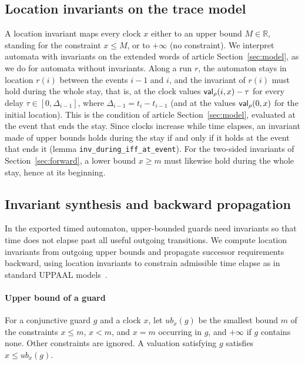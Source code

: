\subsection{Location invariants on the trace model}
\label{sec:inv-semantics}
A location invariant maps every clock $x$ either to an upper bound
$M\in\mathbb R$, standing for the constraint $x\le M$, or to $+\infty$ (no
constraint).  We interpret automata with invariants on the extended words of
article Section~\ref{sec:model}, as we do for automata without invariants.
Along a run $r$, the automaton stays in location $r(i)$ between the events
$i-1$ and $i$, and the invariant of $r(i)$ must hold during the whole stay,
that is, at the clock values $\mathsf{val}_\rho(i,x)-\tau$ for every delay
$\tau\in[0,\Delta_{i-1}]$, where $\Delta_{i-1}=t_i-t_{i-1}$ (and at the values $\mathsf{val}_\rho(0,x)$ for the
initial location).  This is the condition of article Section~\ref{sec:model}, evaluated at
the event that ends the stay.  Since clocks increase while time elapses, an
invariant made of upper bounds holds during the stay if and only if it holds at
the event that ends it (lemma \texttt{inv\_\allowbreak{}during\_\allowbreak{}iff\_\allowbreak{}at\_\allowbreak{}event}).
For the two-sided invariants of Section~\ref{sec:forward}, a lower bound
$x\ge m$ must likewise hold during the whole stay, hence at its beginning.

\subsection{Invariant synthesis and backward propagation}
\label{sec:uppaal-invariants}\label{sec:main-invariants}
In the exported timed automaton, upper-bounded guards need invariants so that
time does not elapse past all useful outgoing transitions.  We compute location
invariants from outgoing upper bounds and propagate successor requirements
backward, using location invariants to constrain admissible time elapse as in
standard UPPAAL models~\cite{[BGD04]}.

\paragraph{Upper bound of a guard}
For a conjunctive guard $g$ and a clock $x$, let $\mathit{ub}_x(g)$ be the
smallest bound $m$ of the constraints $x\le m$, $x<m$, and $x=m$ occurring in
$g$, and $+\infty$ if $g$ contains none.  Other constraints are ignored.  A
valuation satisfying $g$ satisfies $x\le\mathit{ub}_x(g)$.

